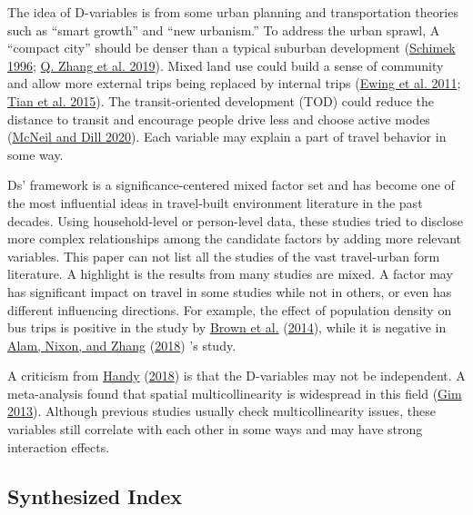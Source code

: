 \documentclass[
  11pt,
  openany]{memoir}
\begin{document}
The idea of D-variables is from some urban planning and transportation theories such as ``smart growth'' and ``new urbanism.''
To address the urban sprawl, A ``compact city'' should be denser than a typical suburban development (\protect\hyperlink{ref-schimekHouseholdMotorVehicle1996}{Schimek 1996}; \protect\hyperlink{ref-zhangHouseholdTripGeneration2019}{Q. Zhang et al. 2019}).
Mixed land use could build a sense of community and allow more external trips being replaced by internal trips (\protect\hyperlink{ref-ewingTrafficGeneratedMixedUse2011}{Ewing et al. 2011}; \protect\hyperlink{ref-tianTrafficGeneratedMixedUse2015}{Tian et al. 2015}).
The transit-oriented development (TOD) could reduce the distance to transit and encourage people drive less and choose active modes (\protect\hyperlink{ref-mcneilRevisitingTODsHow2020}{McNeil and Dill 2020}).
Each variable may explain a part of travel behavior in some way.

Ds' framework is a significance-centered mixed factor set and has become one of the most influential ideas in travel-built environment literature in the past decades. Using household-level or person-level data, these studies tried to disclose more complex relationships among the candidate factors by adding more relevant variables.
This paper can not list all the studies of the vast travel-urban form literature. A highlight is the results from many studies are mixed. A factor may has significant impact on travel in some studies while not in others, or even has different influencing directions. For example, the effect of population density on bus trips is positive in the study by \protect\hyperlink{ref-brownUnderstandingTransitRidership2014}{Brown et al.} (\protect\hyperlink{ref-brownUnderstandingTransitRidership2014}{2014}), while it is negative in \protect\hyperlink{ref-alamFactorsAffectingTravel2018}{Alam, Nixon, and Zhang} (\protect\hyperlink{ref-alamFactorsAffectingTravel2018}{2018}) 's study.

A criticism from \protect\hyperlink{ref-handyEnoughAlreadyLet2018}{Handy} (\protect\hyperlink{ref-handyEnoughAlreadyLet2018}{2018}) is that the D-variables may not be independent. A meta-analysis found that spatial multicollinearity is widespread in this field (\protect\hyperlink{ref-gimRelationshipsLandUse2013}{Gim 2013}). Although previous studies usually check multicollinearity issues, these variables still correlate with each other in some ways and may have strong interaction effects.

\hypertarget{synthesized-index}{%
\subsection{Synthesized Index}\label{synthesized-index}}
\end{document}
